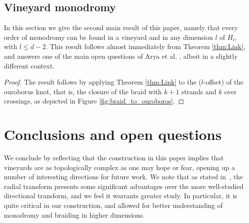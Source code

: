 \documentclass[twoside,leqno]{article}
\begin{document}
%
%
%
%
%
%
%


%
%
%
%
%
%
%
%
%

%
%
%
%

%
%
%
%
%
%
%

%
%
%
%
%
%



\subsection{Vineyard monodromy} 
%

In this section we give the second main result of this paper, namely that every order of monodromy can be found in a vineyard and in any dimension $l$ of $H_l$, with $l\leq d-2$. This result follows almost immediately from Theorem \ref{thm:Link}, and answers one of the main open questions of Arya et al. \cite{Arya2024}, albeit in a slightly different context. 



\thmMonodromy*

\begin{proof} The result follows by applying Theorem \ref{thm:Link} to the ($l$-offset) of the ouroborus knot, that is, the closure of the braid with $k+1$ strands {and $k$ over crossings,} as depicted in Figure \ref{fig:braid_to_ouroboros}. 
\end{proof}




\section{Conclusions and open questions} 


We conclude by reflecting that the construction in this paper implies that vineyards are as topologically complex as one may hope or fear, opening up a number of interesting directions for future work.  We note that as stated in~\cite{onus2024shovingtubesshapesgives}, the radial transform presents some significant advantages over the more well-studied directional transform, and we feel it warrants greater study.  In particular, it is quite critical in our construction, and allowed for better understanding of monodromy and braiding in higher dimensions.
\end{document}
